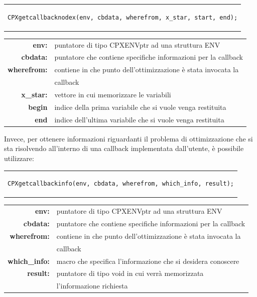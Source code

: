 \begin{center}
\begin{tabular}{c}
\begin{lstlisting}[linewidth=380pt, basicstyle=\footnotesize\sffamily,]     
CPXgetcallbacknodex(env, cbdata, wherefrom, x_star, start, end);
\end{lstlisting}
\end{tabular}
\end{center}
\begin{table}[h]
\centering
\begin{tabular}{rl}
\textbf{env:} & {puntatore di tipo CPXENVptr ad una struttura ENV}\\
\textbf{cbdata:} & {puntatore che contiene specifiche informazioni per la callback}\\
\textbf{wherefrom:} & {contiene in che punto dell'ottimizzazione è stata invocata la} \\ 
&{callback}\\
\textbf{x\_star:} & {vettore in cui memorizzare le variabili} \\
\textbf{begin} & {indice della prima variabile che si vuole venga restituita}\\
\textbf{end} & {indice dell'ultima variabile che si vuole venga restituita}\\           
\end{tabular}
\end{table}
Invece, per ottenere informazioni riguardanti il problema di ottimizzazione che si sta risolvendo all'interno di una callback implementata dall'utente, è possibile utilizzare:
\begin{center}
\begin{tabular}{c}
\begin{lstlisting}[linewidth=380pt, basicstyle=\footnotesize\sffamily,]  
CPXgetcallbackinfo(env, cbdata, wherefrom, which_info, result);
\end{lstlisting}
\end{tabular}
\end{center}
\begin{table}[h]
\centering
\begin{tabular}{rl}
\textbf{env:} & {puntatore di tipo CPXENVptr ad una struttura ENV}\\
\textbf{cbdata:} & {puntatore che contiene specifiche informazioni per la callback}\\
\textbf{wherefrom:} & {contiene in che punto dell'ottimizzazione è stata invocata la}\\ 
&{callback}\\
\textbf{which\_info:} & {macro che specifica l'informazione che si desidera conoscere} \\
\textbf{result:} & {puntatore di tipo void in cui verrà memorizzata}\\          
&{l'informazione richiesta}\\
\end{tabular}
\end{table}
